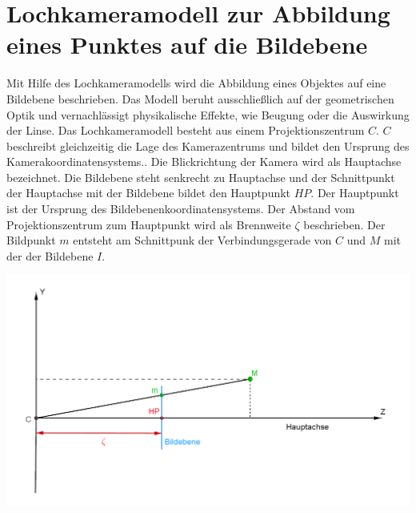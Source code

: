 \section{Lochkameramodell zur Abbildung eines Punktes auf die Bildebene}

Mit Hilfe des Lochkameramodells wird die Abbildung eines Objektes auf eine Bildebene beschrieben. Das Modell beruht ausschließlich auf der geometrischen Optik und vernachlässigt physikalische Effekte, wie Beugung oder die Auswirkung der Linse\cite{Heipke}. Das Lochkameramodell besteht aus einem Projektionszentrum $C$. $C$ beschreibt gleichzeitig die Lage des Kamerazentrums und bildet den Ursprung des Kamerakoordinatensystems.\cite{CamerModels.,HZ}.
Die Blickrichtung der Kamera wird als Hauptachse bezeichnet. Die Bildebene steht senkrecht zu Hauptachse und der Schnittpunkt der Hauptachse mit der Bildebene bildet den Hauptpunkt $HP$. Der Hauptpunkt ist der Ursprung des Bildebenenkoordinatensystems. Der Abstand vom Projektionszentrum zum Hauptpunkt wird als Brennweite $\zeta$ beschrieben\cite{HZ,CamerModels.}. Der Bildpunkt $m$ entsteht am Schnittpunk der Verbindungsgerade von $C$ und $M$ mit der der Bildebene $I$. 

\begin{minipage}{\linewidth}
	\centering
	\includegraphics[width=.8\linewidth]{images/PinholeCameraModell2D.png}
	\label{fig:PinholeCamera2D}
\end{minipage}\\ \\

